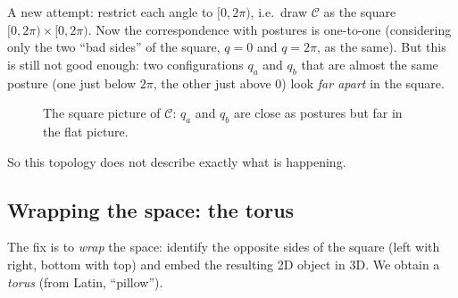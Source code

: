 \documentclass[11pt,a4paper]{article}
\newcommand{\C}{\mathcal{C}}
\theoremstyle{definition}
\theoremstyle{plain}
\begin{document}
A new attempt: restrict each angle to $[0,2\pi)$, i.e.\ draw $\C$ as the square $[0,2\pi)\times[0,2\pi)$. Now the correspondence with postures is one-to-one (considering only the two ``bad sides'' of the square, $q=0$ and $q=2\pi$, as the same). But this is still not good enough: two configurations $q_a$ and $q_b$ that are almost the same posture (one just below $2\pi$, the other just above $0$) look \emph{far apart} in the square.

\begin{figure}[ht]
\centering
{}
\caption{The square picture of $\C$: $q_a$ and $q_b$ are close as postures but far in the flat picture.}
\end{figure}

So this topology does not describe exactly what is happening.

\subsection{Wrapping the space: the torus}

The fix is to \emph{wrap} the space: identify the opposite sides of the square (left with right, bottom with top) and embed the resulting 2D object in 3D. We obtain a \emph{torus} (from Latin, ``pillow'').
\end{document}
